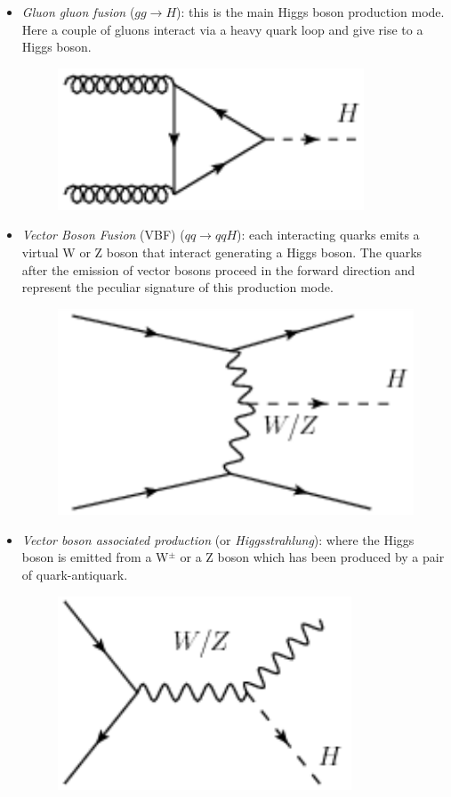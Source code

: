 \begin{itemize}
\item \textit{Gluon gluon fusion} ($gg \rightarrow H$): this is the main Higgs boson production mode. Here a couple of gluons interact via a heavy quark loop and give rise to a Higgs boson.
\begin{figure}[h]
\centering
\vspace{0.5cm}
\includegraphics[scale= 0.7]{../Cap1/gg}
\end{figure}
\item \textit{Vector Boson Fusion} (VBF) ($qq \rightarrow qqH$): each interacting quarks emits a virtual W or Z boson that interact generating a Higgs boson.
The quarks after the emission of vector bosons proceed in the forward direction and represent the peculiar signature of this production mode.
\begin{figure}[h]
\centering
\vspace{1cm}
\includegraphics[scale= 0.6]{../Cap1/vbf}
\end{figure}
\newpage
 \item \textit{Vector boson associated production} (or \textit{Higgsstrahlung}): where the Higgs boson is emitted from a W$^{\pm}$ or a Z boson which has
been produced by a pair of quark-antiquark.
\begin{figure}[h]
\centering
\vspace{0.5cm}
\includegraphics[scale= 0.6]{../Cap1/hlung}

\end{figure}
\end{itemize}
